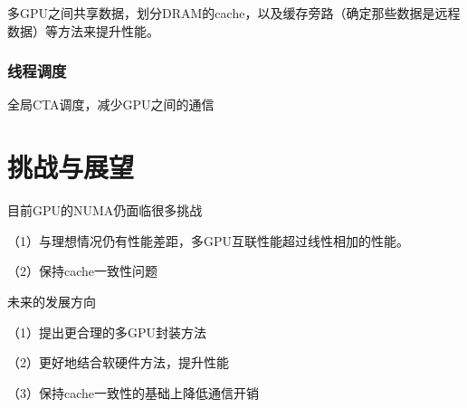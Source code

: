 \documentclass{cjc}
\begin{document}
多GPU之间共享数据，划分DRAM的cache，以及缓存旁路（确定那些数据是远程数据）等方法来提升性能。

\subsubsection{线程调度}

全局CTA调度，减少GPU之间的通信



\section{挑战与展望}

目前GPU的NUMA仍面临很多挑战

  （1）与理想情况仍有性能差距，多GPU互联性能超过线性相加的性能。

  （2）保持cache一致性问题

未来的发展方向

  （1）提出更合理的多GPU封装方法

  （2）更好地结合软硬件方法，提升性能

  （3）保持cache一致性的基础上降低通信开销
\end{document}
